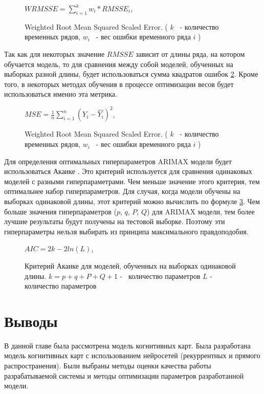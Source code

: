 \def\figurename{Формула}
\begin{figure}[t]
	\centering
	$ WRMSSE = \sum_{i=1}^{k} w_i * RMSSE_i $,
	\caption{
		Weighted Root Mean Squared Scaled Error.
		(
			$ k $ ~- количество временных рядов,
			$ w_i $ ~- вес ошибки временного ряда $ i $
		)
	}
	\label{img:wrmsse}
\end{figure}
\def\figurename{Рис.}

Так как для некоторых значение $ RMSSE $ зависит от длины ряда, на котором обучается
модель, то для сравнения между собой моделей, обученных на выборках разной длины,
будет использоваться сумма квадратов ошибок \ref{img:mse}. Кроме того, в некоторых
методах обучения в процессе оптимизации весов будет использоваться именно эта метрика.

\def\figurename{Формула}
\begin{figure}[t]
	\centering
	$ MSE =  \frac{1}{n} \sum_{i=1}^{n} (Y_i  - \hat{Y_i})^2 $,
	\caption{
		Weighted Root Mean Squared Scaled Error.
		(
			$ k $ ~- количество временных рядов,
			$ w_i $ ~- вес ошибки временного ряда $ i $
		)
	}
	\label{img:mse}
\end{figure}
\def\figurename{Рис.}

Для определения оптимальных гиперпараметров ARIMAX модели будет использоваться Акаике \cite{akaike}.
Это критерий используется для сравнения одинаковых моделей с разными гиперпараметрами.
Чем меньше значение этого критерия, тем оптимальнее набор гиперпараметров.
Для случая, когда модели обучены на выборках одинаковой длины, этот критерий можно вычислить по формуле \ref{img:akaike_creiterion}.
Чем больше значения гиперпараметров ($ p $, $ q $, $ P $, $ Q $) для ARIMAX модели, тем более лучшие
результаты будут получены на тестовой выборке. Поэтому эти гиперпараметры нельзя
выбирать из принципа максимального правдоподобия.

\def\figurename{Формула}
\begin{figure}[t]
	\centering
	$ AIC = 2k - 2 ln(L) $,
	\caption{
		Критерий Акаике для моделей, обученных на выборках одинаковой длины.
		$ k = p + q + P + Q + 1 $ -~ количество параметров
		$ L $ -~ количество параметров
	}
	\label{img:akaike_creiterion}
\end{figure}
\def\figurename{Рис.}


\section{Выводы}

В данной главе была рассмотрена модель когнитивных карт.
Была разработана модель когнитивных карт
с использованием нейросетей (рекуррентных и прямого распространения).
Были выбраны методы оценки качества работы разрабатываемой системы
и методы оптимизации параметров разработанной модели.